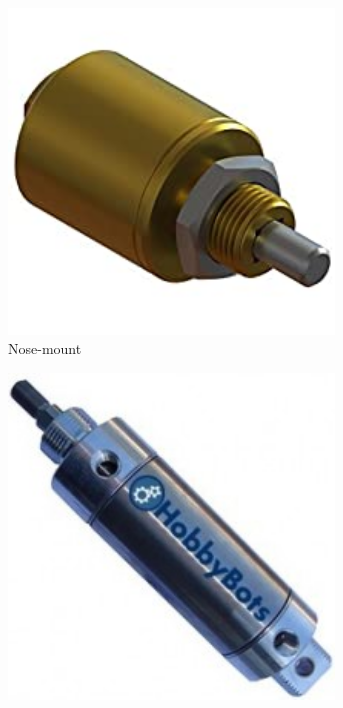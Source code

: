 \documentclass[10pt,letterpaper]{book}
\begin{document}
\begin{figure}[H]
	\begin{subfigure}[b]{.24\linewidth}
		\includegraphics[width=0.95\textwidth]{imgs/piston_nosemount.jpeg}
		\caption{Nose-mount}
	\end{subfigure}
	\begin{subfigure}[b]{.24\linewidth}
		\includegraphics[width=0.95\textwidth]{imgs/piston_universal.png}

\end{subfigure}
\end{figure}
\end{document}

